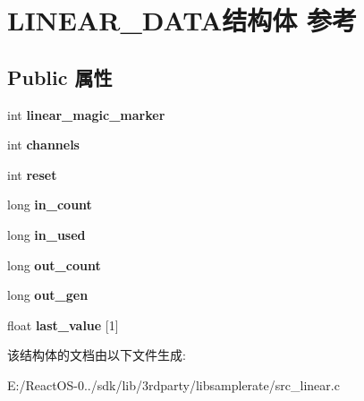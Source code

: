 \hypertarget{struct_l_i_n_e_a_r___d_a_t_a}{}\section{L\+I\+N\+E\+A\+R\+\_\+\+D\+A\+T\+A结构体 参考}
\label{struct_l_i_n_e_a_r___d_a_t_a}
\subsection*{Public 属性}
\begin{DoxyCompactItemize}
\item 
\mbox{\label{struct_l_i_n_e_a_r___d_a_t_a_a068b3ea411217b472e4d7be74ef0442e}} 
int {\bfseries linear\+\_\+magic\+\_\+marker}
\item 
\mbox{\label{struct_l_i_n_e_a_r___d_a_t_a_aa11244ba9867bc4964bd5117e8073c3f}} 
int {\bfseries channels}
\item 
\mbox{\label{struct_l_i_n_e_a_r___d_a_t_a_a32fbd8b20ebb311d89a183c86f296599}} 
int {\bfseries reset}
\item 
\mbox{\label{struct_l_i_n_e_a_r___d_a_t_a_a594766762e5ebc6f5bc0017db4dc6d47}} 
long {\bfseries in\+\_\+count}
\item 
\mbox{\label{struct_l_i_n_e_a_r___d_a_t_a_ae8c6a6d620a6c418b2bf9006fdc624fa}} 
long {\bfseries in\+\_\+used}
\item 
\mbox{\label{struct_l_i_n_e_a_r___d_a_t_a_a3415d76cee3728308e93a8858251dc21}} 
long {\bfseries out\+\_\+count}
\item 
\mbox{\label{struct_l_i_n_e_a_r___d_a_t_a_ab7e9028683d543936daf36da36ceed21}} 
long {\bfseries out\+\_\+gen}
\item 
\mbox{\label{struct_l_i_n_e_a_r___d_a_t_a_aca4e7ae956d2a886eef7444e9e96effd}} 
float {\bfseries last\+\_\+value} \mbox{[}1\mbox{]}
\end{DoxyCompactItemize}


该结构体的文档由以下文件生成\+:\begin{DoxyCompactItemize}
\item 
E\+:/\+React\+O\+S-\/0../sdk/lib/3rdparty/libsamplerate/src\+\_\+linear.\+c\end{DoxyCompactItemize}
